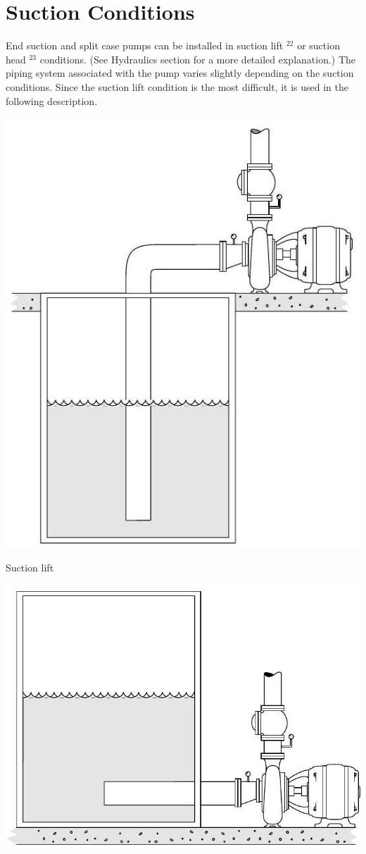 \documentclass[10pt]{article}
\begin{document}
\section{Suction Conditions}
End suction and split case pumps can be installed in suction lift ${ }^{22}$ or suction head ${ }^{23}$ conditions. (See Hydraulics section for a more detailed explanation.) The piping system associated with the pump varies slightly depending on the suction conditions. Since the suction lift condition is the most difficult, it is used in the following description.

\includegraphics[max width=\textwidth]{SuctionLift}

Suction lift

\includegraphics[max width=\textwidth]{SuctionHead}
\end{document}
